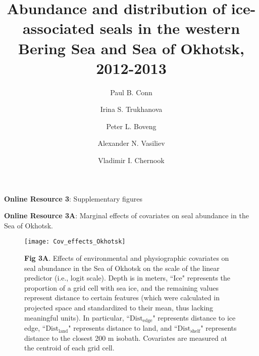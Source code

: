 \documentclass{svjour3}
\begin{document}
\title{Abundance and distribution of ice-associated seals in the western Bering Sea and Sea of Okhotsk, 2012-2013}

\author{Paul B. Conn \and
        Irina S. Trukhanova \and
        Peter L. Boveng \and
        Alexander N. Vasiliev \and
        Vladimir I. Chernook
}



\captionsetup{labelformat=empty}

\maketitle

\large
\bigskip
\centerline{\textbf{Online Resource 3}: Supplementary figures}
\bigskip
\small

\pagebreak

\textbf{Online Resource 3A}: Marginal effects of covariates on seal abundance in the Sea of Okhotsk.
\begin{figure}[ht]
\centering
\texttt{[image: Cov\_effects\_Okhotsk]}
\caption{\textbf{Fig 3A}. Effects of environmental and physiographic covariates on seal abundance in the Sea of Okhotsk on the scale of the linear predictor (i.e., logit scale). Depth is in meters, ``Ice" represents the proportion of a grid cell with sea ice, and the remaining values represent distance to certain features (which were calculated in projected space and standardized to their mean, thus lacking meaningful units).  In particular, ``$\text{Dist}_\text{edge}$" represents distance to ice edge, ``$\text{Dist}_\text{land}$" represents distance to land, and ``$\text{Dist}_\text{shelf}$" represents distance to the closest 200 m isobath. Covariates are measured at the centroid of each grid cell.   }
\label{fig:covo}
\end{figure}
\end{document}
